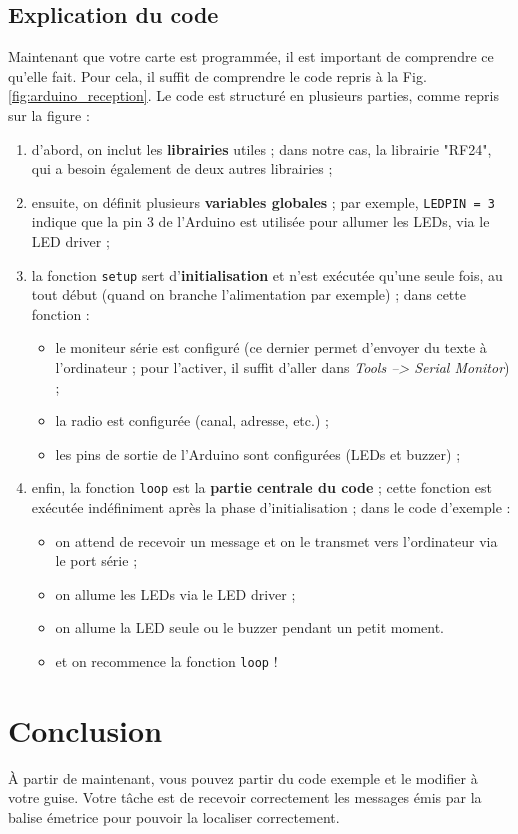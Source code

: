\documentclass[a4paper,10pt,twoside]{article}
\begin{document}
\subsection{Explication du code}
Maintenant que votre carte est programmée, il est important de comprendre ce qu'elle fait. Pour cela, il suffit de comprendre le code repris à la Fig. \ref{fig:arduino_reception}. Le code est structuré en plusieurs parties, comme repris sur la figure :
\begin{enumerate}
	\item d'abord, on inclut les \textbf{librairies} utiles ; dans notre cas, la librairie "RF24", qui a besoin également de deux autres librairies ;
	\item ensuite, on définit plusieurs \textbf{variables globales} ; par exemple, \texttt{LEDPIN = 3} indique que la pin 3 de l'Arduino est utilisée pour allumer les LEDs, via le LED driver ; 
	\item la fonction \texttt{setup} sert d'\textbf{initialisation} et n'est exécutée qu'une seule fois, au tout début (quand on branche l'alimentation par exemple) ; dans cette fonction :
		\begin{itemize}
			\item le moniteur série est configuré (ce dernier permet d'envoyer du texte à l'ordinateur ; pour l'activer, il suffit d'aller dans \textit{Tools --> Serial Monitor}) ;
			\item la radio est configurée (canal, adresse, etc.) ;
			\item les pins de sortie de l'Arduino sont configurées (LEDs et buzzer) ;
		\end{itemize}
	\item enfin, la fonction \texttt{loop} est la \textbf{partie centrale du code} ; cette fonction est exécutée indéfiniment après la phase d'initialisation ; dans le code d'exemple :
		\begin{itemize}
			\item on attend de recevoir un message et on le transmet vers l'ordinateur via le port série ;
			\item on allume les LEDs via le LED driver ;
			\item on allume la LED seule ou le buzzer pendant un petit moment.
			\item et on recommence la fonction \texttt{loop} !
		\end{itemize}			
\end{enumerate}
	
\section{Conclusion}
À partir de maintenant, vous pouvez partir du code exemple et le modifier à votre guise. Votre tâche est de recevoir correctement les messages émis par la balise émetrice pour pouvoir la localiser correctement. 
\end{document}
